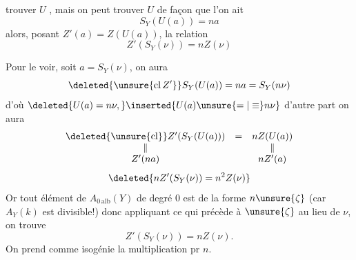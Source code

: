 trouver \(U\) , mais on peut trouver \(U\) de façon que l'on ait
\[
S_Y(U(a))=na
\]
alors, posant \(Z'(a)=Z(U(a))\), la relation
\[
Z'(S_Y(\nu))=nZ(\nu)
\]

Pour le voir, soit \(a=S_Y(\nu)\), on aura
\[
\deleted{\unsure{\operatorname{cl}Z'}}S_Y(U(a))=na=S_Y(n\nu)
\]
d'où \(\deleted{U(a)=n\nu,}\inserted{U(a)\unsure{=|\equiv}n\nu}\)
d'autre part on aura
\[
\begin{array}{ccc}
\deleted{\unsure{\operatorname{cl}}}Z'(S_Y(U(a)))&=&nZ(U(a))\\
\Vert&&\Vert\\
Z'(na)&&nZ'(a)
\end{array}
\]
\[
\deleted{nZ'(S_Y(\nu))=n^2Z(\nu)}
\]
Or tout élément de \(A_{0\,\mathrm{alb}}(Y)\) de degré 0 est de la forme \(n\unsure{\zeta}\) (car \(A_Y(k)\) est divisible!) donc appliquant ce qui précède à \(\unsure{\zeta}\) au lieu de \(\nu\), on trouve
\[
Z'(S_Y(\nu))=nZ(\nu).
\]
On prend comme isogénie la multiplication pr \(n\).
